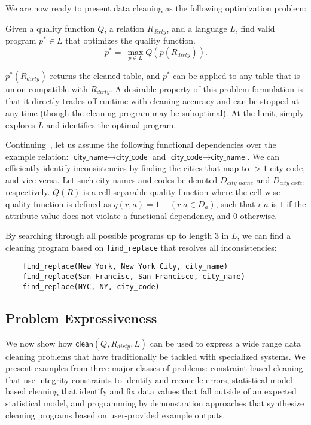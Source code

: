 \noindent We are now ready to present data cleaning as the following optimization problem:
\begin{problem}
Given a quality function $Q$, a relation $R_{dirty}$, and a language $L$, find valid program $p^* \in L$ that optimizes the quality function.
\[
p^* = ~ \max_{p \in L} Q( p(R_{dirty}) ).  
\]
\end{problem}
$p^*(R_{dirty})$ returns the cleaned table, and $p^*$ can be applied to any table that is union compatible with $R_{dirty}$.
A desirable property of this problem formulation is that it directly trades off runtime with cleaning accuracy and can be stopped at any time (though the cleaning program may be suboptimal).  At the limit, \sys simply explores $L$ and identifies the optimal program.


\begin{example}\label{ex3}
Continuing~, let us assume the following functional dependencies over the example relation: $\textsf{city\_name} \rightarrow \textsf{city\_code}$ and $\textsf{city\_code} \rightarrow \textsf{city\_name}$.
We can efficiently identify inconsistencies by finding the cities that map to $>1$ city code, and vice versa.   Let such city names and codes be denoted $D_{city\_name}$ and $D_{city\_code}$, respectively.
$Q(R)$ is a cell-separable quality function where the cell-wise quality function is defined as $q(r, a) = 1 - (r.a \in D_a)$, such that $r.a$ is $1$ if the attribute value does not violate a functional dependency, and $0$ otherwise.

By searching through all possible programs up to length 3 in $L$, we can find a cleaning program based on \texttt{find\_replace} that resolves all inconsistencies:
\begin{lstlisting}
    find_replace(New York, New York City, city_name)
    find_replace(San Francisc, San Francisco, city_name)
    find_replace(NYC, NY, city_code)
\end{lstlisting}
\end{example}


\subsection{Problem Expressiveness}\label{s:probexpressiveness}
We now show how $\textsf{clean}(Q,R_{dirty},L)$ can be used to express a wide range data cleaning problems that have traditionally be tackled with specialized systems.  We present examples from three major classes of problems: constraint-based cleaning that use integrity constraints to identify and reconcile errors, statistical model-based  cleaning that identify and fix data values that fall outside of an expected statistical model, and programming by demonstration approaches that synthesize cleaning programs based on user-provided example outputs.  

